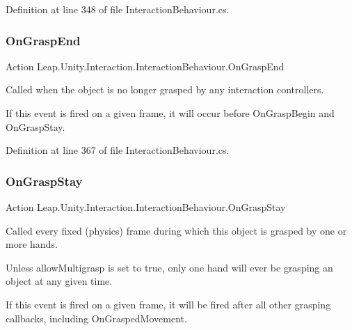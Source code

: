 Definition at line 348 of file Interaction\+Behaviour.\+cs.

\mbox{\label{class_leap_1_1_unity_1_1_interaction_1_1_interaction_behaviour_aa28fa95514cad60b292efec67f235e35}} 
\subsubsection{\texorpdfstring{OnGraspEnd}{OnGraspEnd}}
{\footnotesize\ttfamily Action Leap.\+Unity.\+Interaction.\+Interaction\+Behaviour.\+On\+Grasp\+End}



Called when the object is no longer grasped by any interaction controllers. 

If this event is fired on a given frame, it will occur before On\+Grasp\+Begin and On\+Grasp\+Stay. 

Definition at line 367 of file Interaction\+Behaviour.\+cs.

\mbox{\label{class_leap_1_1_unity_1_1_interaction_1_1_interaction_behaviour_a244ec47dabdd267d0b7b37a599e04fc0}} 
\subsubsection{\texorpdfstring{OnGraspStay}{OnGraspStay}}
{\footnotesize\ttfamily Action Leap.\+Unity.\+Interaction.\+Interaction\+Behaviour.\+On\+Grasp\+Stay}



Called every fixed (physics) frame during which this object is grasped by one or more hands. 

Unless allow\+Multigrasp is set to true, only one hand will ever be grasping an object at any given time. 

If this event is fired on a given frame, it will be fired after all other grasping callbacks, including On\+Grasped\+Movement. 

